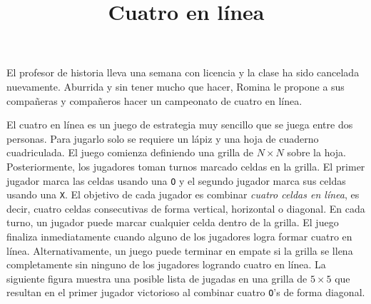 \documentclass{oci}
\title{Cuatro en línea}
\begin{document}
\begin{problemDescription}
  El profesor de historia lleva una semana con
  licencia y la clase ha sido cancelada nuevamente.
  Aburrida y sin tener mucho que hacer, Romina le
  propone a sus compañeras y compañeros hacer un campeonato
  de cuatro en línea.

  El cuatro en línea es un juego de estrategia
  muy sencillo que se juega entre dos personas.
  Para jugarlo solo se requiere un lápiz y una hoja de
  cuaderno cuadriculada.
  El juego comienza definiendo una grilla de
  $N\times N$ sobre la hoja.
  Posteriormente, los jugadores toman turnos
  marcado celdas en la grilla.
  El primer jugador marca las celdas usando una \texttt{O}
  y el segundo jugador marca sus celdas usando una \texttt{X}.
  El objetivo de cada jugador es combinar \emph{cuatro celdas
  en línea}, es decir, cuatro celdas consecutivas de forma
  vertical, horizontal o diagonal.
  En cada turno, un jugador puede marcar cualquier celda dentro
  de la grilla.
  El juego finaliza inmediatamente cuando alguno de los jugadores
  logra formar cuatro en línea.
  Alternativamente, un juego puede terminar en empate si la grilla
  se llena completamente sin ninguno de los jugadores logrando
  cuatro en línea.
  La siguiente figura muestra una posible lista de jugadas
  en una grilla de $5\times 5$ que resultan en el primer jugador
  victorioso al combinar cuatro \texttt{O}'s de forma diagonal.
  \begin{center}
  \begin{minipage}{0.8\textwidth}


\end{minipage}
\end{center}
\end{problemDescription}
\end{document}

